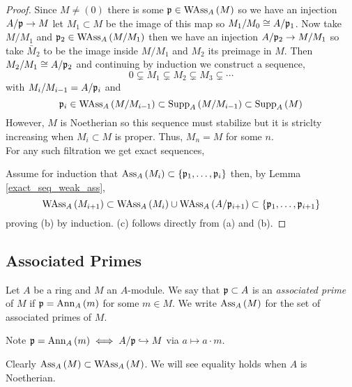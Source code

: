 \documentclass[12pt]{article}
\begin{document}
\begin{proof}
Since $M \neq (0)$ there is some $\mathfrak{p} \in \mathrm{WAss}_{A}\left(M \right)$ so we have an injection $A / \mathfrak{p} \to M$ let $M_1 \subset M$ be the image of this map so $M_1 / M_0 \cong A / \mathfrak{p}_1$. Now take $M / M_1$ and $\mathfrak{p}_2 \in \mathrm{WAss}_{A}\left(M/M_1 \right)$ then we have an injection $A / \mathfrak{p}_2 \to M/M_1$ so take $\bar{M}_2$ to be the image inside $M/M_1$ and $M_2$ its preimage in $M$. Then $M_2 / M_1 \cong A / \mathfrak{p}_2$ and continuing by induction we construct a sequence,
\[ 0 \subsetneq M_1 \subsetneq M_2 \subsetneq M_3 \subsetneq \cdots \]
with $M_{i}/M_{i-1} = A / \mathfrak{p}_i$ and 
\[ \mathfrak{p}_i \in \mathrm{WAss}_{A}\left(M/M_{i-1} \right) \subset \mathrm{Supp}_{A}\left(M/M_{i-1} \right) \subset \mathrm{Supp}_{A}\left(M \right) \]
However, $M$ is Noetherian so this sequence must stabilize but it is striclty increasing when $M_i \subset M$ is proper. Thus, $M_n  = M$ for some $n$. 
\bigskip\\
For any such filtration we get exact sequences,
\begin{center}
\end{center}
Assume for induction that $\mathrm{Ass}_{A}\left( M_i \right) \subset \{\mathfrak{p}_1, \dots, \mathfrak{p}_i \}$ then, by Lemma \ref{exact_seq_weak_ass},
\[ \mathrm{WAss}_{A}\left(M_{i+1} \right) \subset \mathrm{WAss}_{A}\left(M_i \right) \cup \mathrm{WAss}_{A}\left(A / \mathfrak{p}_{i+1} \right) \subset \{\mathfrak{p}_1, \dots, \mathfrak{p}_{i+1} \} \]
proving (b) by induction. (c) follows directly from (a) and (b). 
\end{proof}

\subsection{Associated Primes}

\begin{defn}
Let $A$ be a ring and $M$ an $A$-module. We say that $\mathfrak{p} \subset A$ is an \textit{associated prime} of $M$ if $\mathfrak{p} = \mathrm{Ann}_{A}\left(m\right)$ for some $m \in M$. We write $\mathrm{Ass}_{A}\left( M \right)$ for the set of associated primes of $M$.
\end{defn}

\begin{rmk}
Note $\mathfrak{p} = \mathrm{Ann}_{A}\left(m\right) \iff A / \mathfrak{p} \hookrightarrow M$ via $a \mapsto a \cdot m$.
\end{rmk}

\begin{rmk}
Clearly $\mathrm{Ass}_{A}\left( M \right) \subset \mathrm{WAss}_{A}\left(M \right)$. We will see equality holds when $A$ is Noetherian.
\end{rmk}
\end{document}
